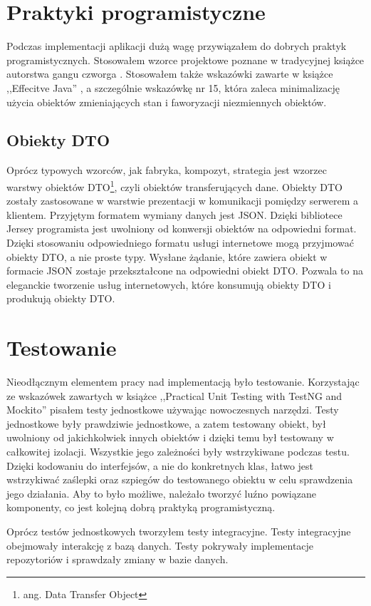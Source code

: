 \documentclass[a4paper,onecolumn,oneside,11pt,wide,floatssmall]{mwrep}
\theoremstyle{definition}
\theoremstyle{plain}%
\theoremstyle{remark}
\begin{document}
\section{Praktyki programistyczne}
Podczas implementacji aplikacji dużą wagę przywiązałem do dobrych praktyk programistycznych. Stosowałem wzorce projektowe poznane w tradycyjnej książce autorstwa gangu czworga \cite{gamma1994design}. Stosowałem także wskazówki zawarte w książce ,,Effecitve Java'' \cite{bloch2008effective}, a szczególnie wskazówkę nr 15, która zaleca minimalizację użycia obiektów zmieniających stan i faworyzacji niezmiennych obiektów.

\subsection{Obiekty DTO}
Oprócz typowych wzorców, jak fabryka, kompozyt, strategia jest wzorzec warstwy obiektów DTO\footnote{ang. Data Transfer Object}, czyli obiektów transferujących dane. Obiekty DTO zostały zastosowane w warstwie prezentacji w komunikacji pomiędzy serwerem a klientem. Przyjętym formatem wymiany danych jest JSON. Dzięki bibliotece Jersey programista jest uwolniony od konwersji obiektów na odpowiedni format. Dzięki stosowaniu odpowiedniego formatu usługi internetowe mogą przyjmować obiekty DTO, a nie proste typy. Wysłane żądanie, które zawiera obiekt w formacie JSON zostaje przekształcone na odpowiedni obiekt DTO. Pozwala to na eleganckie tworzenie usług internetowych, które konsumują obiekty DTO i produkują obiekty DTO.

\section{Testowanie}
Nieodłącznym elementem pracy nad implementacją było testowanie. Korzystając ze wskazówek zawartych w książce ,,Practical Unit Testing with TestNG and Mockito'' \cite{kaczanowski2012practical} pisałem testy jednostkowe używając nowoczesnych narzędzi. Testy jednostkowe były prawdziwie jednostkowe, a zatem testowany obiekt, był uwolniony od jakichkolwiek innych obiektów i dzięki temu był testowany w całkowitej izolacji. Wszystkie jego zależności były wstrzykiwane podczas testu. Dzięki kodowaniu do interfejsów, a nie do konkretnych klas, łatwo jest wstrzykiwać zaślepki oraz szpiegów do testowanego obiektu w celu sprawdzenia jego działania. Aby to było możliwe, należało tworzyć luźno powiązane komponenty, co jest kolejną dobrą praktyką programistyczną.

Oprócz testów jednostkowych tworzyłem testy integracyjne. Testy integracyjne obejmowały interakcję z bazą danych. Testy pokrywały implementacje repozytoriów i sprawdzały zmiany w bazie danych. 
\end{document}
